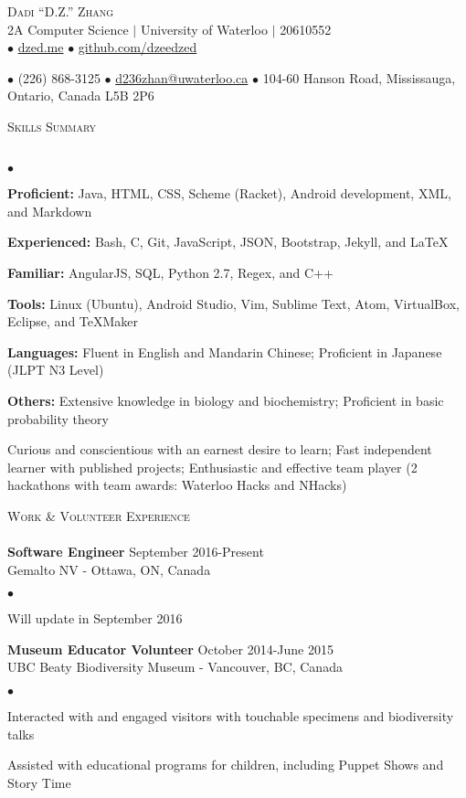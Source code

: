 \documentclass{article}
\newcommand{\lineunder}{\vspace*{-8pt} \\ \hspace*{-18pt} \hrulefill \\}
\newcommand{\header}[1]{{\hspace*{-15pt}\vspace*{6pt} \textsc{#1}} \vspace*{-6pt} \lineunder}
\newcommand{\employer}[3]{{ \textbf{#1} \hfill #2\\ {#3}\\  }}
\newcommand{\contact}[3]{
\begin{center}
{}
\end{center}
\vspace*{-8pt}
\begin{center}
{\LARGE \scshape {#1}}\\
#2\\
#3
\end{center}
\vspace*{-8pt}
}
\newenvironment{achievements}{\begin{list}{$\bullet$}{\topsep 0pt \itemsep -2pt}}{\vspace*{4pt}\end{list}}
\begin{document}
\small
\smallskip
\vspace*{-88pt}

\contact{Dadi ``D.Z.'' Zhang}
{2A Computer Science $\vert$ University of Waterloo $\vert$ 20610552}
{$\bullet$ \href{http://dzed.me}{dzed.me}
$\bullet$ \href{http://github.com/dzeedzed}{github.com/dzeedzed}}
{$\bullet$ (226) 868-3125
$\bullet$ \href{mailto:d236zhan@uwaterloo.ca}{d236zhan@uwaterloo.ca}
$\bullet$ 104-60 Hanson Road, Mississauga, Ontario, Canada L5B 2P6}

\hfill \break
\header{Skills Summary}
\begin{achievements}
\item \textbf{Proficient:} Java, HTML, CSS,  Scheme (Racket), Android development, XML, and Markdown
\item \textbf{Experienced:} Bash, C, Git, JavaScript, JSON, Bootstrap, Jekyll, and  \LaTeX\
\item \textbf{Familiar:} AngularJS, SQL, Python 2.7, Regex, and C++
\item \textbf{Tools:} Linux (Ubuntu), Android Studio, Vim, Sublime Text, Atom, VirtualBox, Eclipse, and TeXMaker
\item \textbf{Languages:} Fluent in English and Mandarin Chinese; Proficient in Japanese (JLPT N3 Level)
\item \textbf{Others:} Extensive knowledge in biology and biochemistry; Proficient in basic probability theory
\item Curious and conscientious with an earnest desire to learn; Fast independent learner with published projects; Enthusiastic and effective team player (2 hackathons with team awards: Waterloo Hacks and NHacks)
\end{achievements}

\header{Work \& Volunteer Experience}

\employer{Software Engineer}{September 2016-Present}{Gemalto NV - Ottawa, ON, Canada}
	\begin{achievements}
	\item Will update in September 2016
	\end{achievements}
\employer{Museum Educator Volunteer}{October 2014-June 2015}{UBC Beaty Biodiversity Museum - Vancouver, BC, Canada}
	\begin{achievements}
	\item Interacted with and engaged visitors with touchable specimens and biodiversity talks
	\item Assisted with educational programs for children, including Puppet Shows and Story Time 
	\end{achievements}
\end{document}
